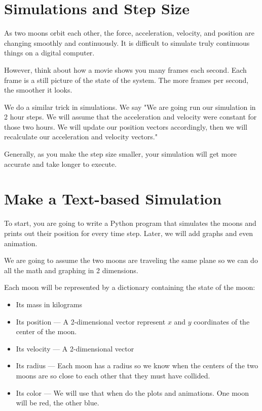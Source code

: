 \section{Simulations and Step Size}

As two moons orbit each other,  the force, acceleration, velocity, and position are changing smoothly and continuously.  It is difficult to simulate truly continuous things on a digital computer.

However,  think about how a movie shows you many frames each second.   Each frame is a still picture of the 
state of the system.  The more frames per second,  the smoother it looks.

We do a similar trick in simulations. We say "We are going run our simulation in 2 hour steps. We will assume
that the acceleration and velocity were constant for those two hours.   We will update our position vectors accordingly, then we will recalculate our acceleration and velocity vectors."

Generally, as you make the step size smaller,  your simulation will get more accurate and take longer to execute.

\section{Make a Text-based Simulation}

To start, you are going to write a Python program that simulates the moons and prints out their
position for every time step.  Later, we will add graphs and even animation.

We are going to assume the two moons are traveling the same plane so we can do all the math and graphing 
in 2 dimensions.

Each moon will be represented by a dictionary containing the state of the moon:
\begin{itemize}
\item Its mass in kilograms
\item Its position --- A 2-dimensional vector represent $x$ and $y$ coordinates of the center of the moon.
\item Its velocity --- A 2-dimensional vector
\item Its radius --- Each moon has a radius so we know when the centers of the two moons are so close to each other that they must have collided.
\item Its color --- We will use that when do the plots and animations.  One moon will be red, the other blue.
\end{itemize}

